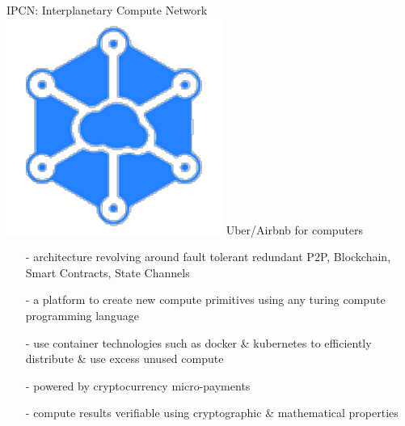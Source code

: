 \documentclass[10pt]{beamer}
\begin{document}
\begin{frame}[t]{IPCN: Interplanetary Compute Network}
	\includegraphics[scale=.3]{static/ipcn-p2p} Uber/Airbnb for computers
    \begin{itemize}
        \item[-]architecture revolving around fault tolerant redundant P2P, Blockchain, Smart Contracts, State Channels
        \item[-]a platform to create new compute primitives using any turing compute programming language
        \item[-]use container technologies such as docker \& kubernetes to efficiently distribute \& use excess unused compute
        \item[-]powered by cryptocurrency micro-payments
        \item[-]compute results verifiable using cryptographic \& mathematical properties
    \end{itemize}
\end{frame}
\end{document}
